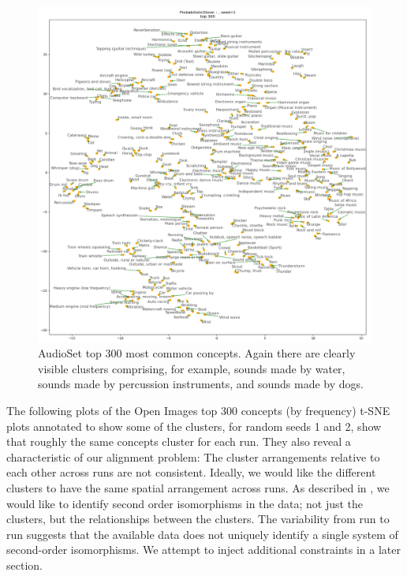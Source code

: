 \begin{figure}[H]
    \centering
    \includegraphics[width=\textwidth]{images/method/probabilistic_independent/top300_tsne_audioset__ProbabilisticGlove_1.png}
    \caption{
        AudioSet top 300 most common concepts. Again there are clearly visible clusters comprising, for example, sounds made by water, sounds made by percussion instruments, and sounds made by dogs. 
    }
\end{figure}

The following plots of the Open Images top 300 concepts (by frequency) t-SNE plots annotated to show some of the clusters, for random seeds 1 and 2, show that roughly the same concepts cluster for each run. They also reveal a characteristic of our alignment problem: The cluster arrangements relative to each other across runs are not consistent. Ideally, we would like the different clusters to have the same spatial arrangement across runs. As described in \cite{SHEPARD19701}, we would like to identify second order isomorphisms in the data; not just the clusters, but the relationships between the clusters. The variability from run to run suggests that the available data does not uniquely identify a single system of second-order isomorphisms. We attempt to inject additional constraints in a later section.

